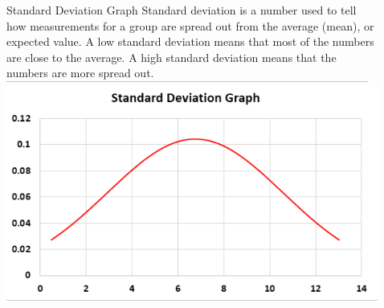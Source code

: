 \documentclass[final]{beamer}
\newlength{\sepwid}
\newlength{\onecolwid}
\newlength{\twocolwid}
\begin{document}
\begin{frame}[t]
\begin{columns}[t]
\begin{column}{\twocolwid}
\begin{alertblock}{Standard Deviation Graph}
Standard deviation is a number used to tell how measurements for a group are spread out from the average (mean), or expected value. A low standard deviation means that most of the numbers are close to the average. A high standard deviation means that the numbers are more spread out.
\includegraphics[scale=2.4]{SDgraph.PNG}\newline
\end{alertblock} 


\begin{columns}[t,totalwidth=\twocolwid] %



\end{columns} %

\end{column} %

\begin{column}{\sepwid}\end{column} %

\begin{column}{\onecolwid} %



\end{column}
\end{columns}
\end{frame}
\end{document}
